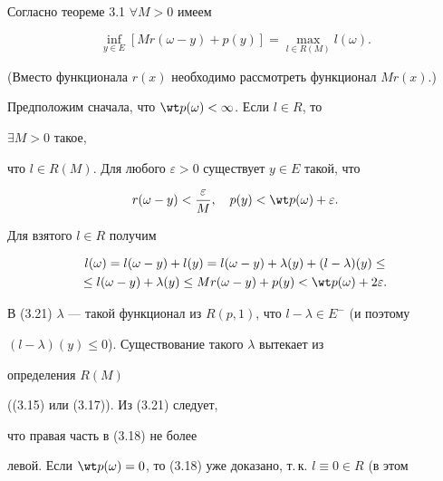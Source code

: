 \begin{pf} 


Согласно теореме 3.1 $\forall M>0$ имеем 


\begin{equation} 


\inf_{y\in E}[M r(\omega-y)+p(y)]= 


\max_{l\in R(M)}l(\omega). 


\end{equation} 


(Вместо функционала $r(x)$ необходимо рассмотреть функционал $M r(x)$.) 


Предположим сначала, что $\wt p(\omega)<\infty$. Если $l\in R$, то 


$\exists M>0$ такое, 


что $l\in R(M)$. Для любого $\varepsilon>0$ существует $y\in E$ такой, что 


\begin{equation} 


r(\omega-y)<\frac{\varepsilon}{M},\quad 


p(y)<\wt p(\omega)+\varepsilon. 


\end{equation} 


Для взятого $l\in R$ получим 


\begin{multline} 


l(\omega)=l(\omega-y)+l(y)=l(\omega-y)+\lambda(y)+ 


(l-\lambda)(y) \le \\ 


% 


\le l(\omega-y)+\lambda(y)\le M r(\omega-y)+ 


p(y)<\wt p(\omega)+2\varepsilon. 


\end{multline} 


В (3.21) $\lambda$ --- такой функционал из $R(p,1)$, что $l-\lambda\in 


E^-$ (и поэтому 


$(l-\lambda)(y)\le0$). Существование такого $\lambda$ вытекает из 


определения $R(M)$ 


((3.15) или (3.17)). Из (3.21) следует, 


что правая часть в (3.18) не более 


левой. Если $\wt p(\omega)=0$, то (3.18) уже доказано, т.\,к. $l\equiv0\in 


R$ (в этом 



\end{pf}
